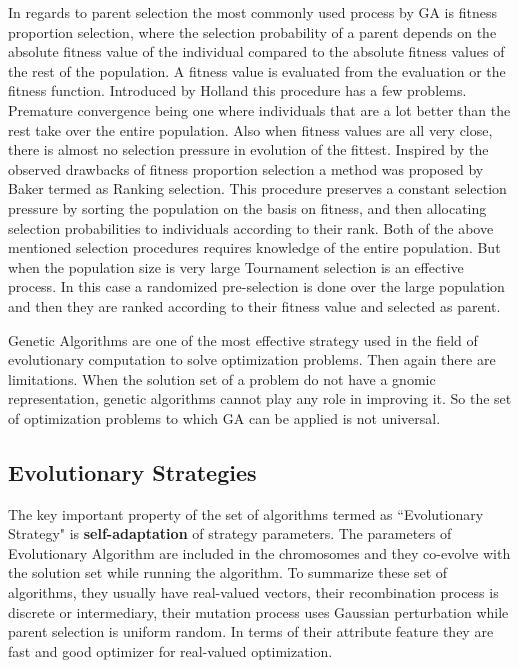 In regards to parent selection the most commonly used process by GA is fitness proportion selection, where the selection probability of a parent depends on the absolute fitness value of the individual compared to the absolute fitness values of the rest of the population. A fitness value is evaluated from the evaluation or the fitness function. Introduced by Holland \cite{holland1975} this procedure has a few problems. Premature convergence being one where individuals that are a lot better than the rest take over the entire population. Also when fitness values are all very close, there is almost no selection pressure in evolution of the fittest. Inspired by the observed drawbacks of fitness proportion selection a method was proposed by Baker \cite{baker1987} termed as Ranking selection. This procedure preserves a constant selection pressure by sorting the population on the basis on fitness, and then allocating selection probabilities to individuals according to their rank. Both of the above mentioned selection procedures requires knowledge of the entire population. But when the population size is very large Tournament selection is an effective process. In this case a randomized pre-selection is done over the large population and then they are ranked according to their fitness value and selected as parent. 

Genetic Algorithms are one of the most effective strategy used in the field of evolutionary computation to solve optimization problems. Then again there are limitations. When the solution set of a problem do not have a gnomic representation, genetic algorithms cannot play any role in improving it. So the set of optimization problems to which GA can be applied is not universal.

\subsection{Evolutionary Strategies}
The key important property of the set of algorithms termed as ``Evolutionary Strategy" is \textbf{self-adaptation} of strategy parameters. The  parameters of Evolutionary Algorithm are included in the chromosomes and they co-evolve with the solution set while running the algorithm. To summarize these set of algorithms, they usually have real-valued vectors, their recombination process is discrete or intermediary, their mutation process uses Gaussian perturbation while parent selection is uniform random. In terms of their attribute feature they are fast and good optimizer for real-valued optimization.

